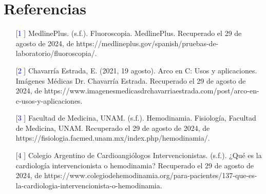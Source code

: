 \documentclass{article}
\begin{document}
\section*{Referencias}

\begin{enumerate}
    \item [[\textcolor{blue}{1}]] MedlinePlus. (s.f.). Fluoroscopia. MedlinePlus. Recuperado el 29 de agosto de 2024, de https://medlineplus.gov/spanish/pruebas-de-laboratorio/fluoroscopia/.
    \item [[\textcolor{blue}{2}]] Chavarría Estrada, E. (2021, 19 agosto). Arco en C: Usos y aplicaciones. Imágenes Médicas Dr. Chavarría Estrada. Recuperado el 29 de agosto de 2024, de https://www.imagenesmedicasdrchavarriaestrada.com/post/arco-en-c-usos-y-aplicaciones.
    \item  [[\textcolor{blue}{3}]] Facultad de Medicina, UNAM. (s.f.). Hemodinamia. Fisiología, Facultad de Medicina, UNAM. Recuperado el 29 de agosto de 2024, de https://fisiologia.facmed.unam.mx/index.php/hemodinamia/.
    \item  [[\textcolor{blue}{4}]] Colegio Argentino de Cardioangiólogos Intervencionistas. (s.f.). ¿Qué es la cardiología intervencionista o hemodinamia? Recuperado el 29 de agosto de 2024, de https://www.colegiodehemodinamia.org/para-pacientes/137-que-es-la-cardiologia-intervencionista-o-hemodinamia.

\end{enumerate}
\end{document}
